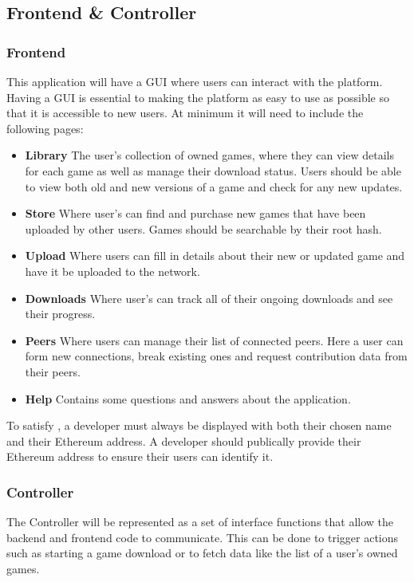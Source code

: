\subsection{Frontend \& Controller}

\subsubsection{Frontend}\label{subsubsec:frontend}

This application will have a GUI   where users can interact with the platform. Having a GUI is essential to making the platform as easy to use as possible so that it is accessible to new users. At minimum it will need to include the following pages:

\begin{itemize}
  \item \textbf{Library} The user's collection of owned games, where they can view details for each game as well as manage their download status. Users should be able to view both old and new versions of a game and check for any new updates.
  \item \textbf{Store} Where user's can find and purchase new games that have been uploaded by other users. Games should be searchable by their root hash.
  \item \textbf{Upload} Where users can fill in details about their new or updated game and have it be uploaded to the network.
  \item \textbf{Downloads} Where user's can track all of their ongoing downloads and see their progress.
  \item \textbf{Peers} Where users can manage their list of connected peers. Here a user can form new connections, break existing ones and request contribution data from their peers.
  \item \textbf{Help}  Contains some questions and answers about the application.
\end{itemize}

\newparagraph
To satisfy , a developer must always be displayed with both their chosen name and their Ethereum address. A developer should publically provide their Ethereum address to ensure their users can identify it.

\subsubsection{Controller}

The Controller will be represented as a set of interface functions that allow the backend and frontend code to communicate. This can be done to trigger actions such as starting a game download or to fetch data like the list of a user's owned games.
